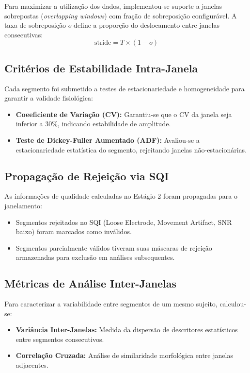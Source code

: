 Para maximizar a utilização dos dados, implementou-se suporte a janelas sobrepostas (\textit{overlapping windows}) com fração de sobreposição configurável. A taxa de sobreposição $o$ define a proporção do deslocamento entre janelas consecutivas:
\begin{equation}
    \text{stride} = T \times (1 - o)
\end{equation}
\subsection{Critérios de Estabilidade Intra-Janela}

Cada segmento foi submetido a testes de estacionariedade e homogeneidade para garantir a validade fisiológica:

\begin{itemize}
    \item \textbf{Coeeficiente de Variação (CV):} Garantiu-se que o CV da janela seja inferior a 30\%, indicando estabilidade de amplitude.
    \item \textbf{Teste de Dickey-Fuller Aumentado (ADF):} Avaliou-se a estacionariedade estatística do segmento, rejeitando janelas não-estacionárias.
\end{itemize}

\subsection{Propagação de Rejeição via SQI}

As informações de qualidade calculadas no Estágio 2 foram propagadas para o janelamento:
\begin{itemize}
    \item Segmentos rejeitados no SQI (Loose Electrode, Movement Artifact, SNR baixo) foram marcados como inválidos.
    \item Segmentos parcialmente válidos tiveram suas máscaras de rejeição armazenadas para exclusão em análises subsequentes.
\end{itemize}

\subsection{Métricas de Análise Inter-Janelas}

Para caracterizar a variabilidade entre segmentos de um mesmo sujeito, calculou-se:
\begin{itemize}
    \item \textbf{Variância Inter-Janelas:} Medida da dispersão de descritores estatísticos entre segmentos consecutivos.
    \item \textbf{Correlação Cruzada:} Análise de similaridade morfológica entre janelas adjacentes.
\end{itemize}

